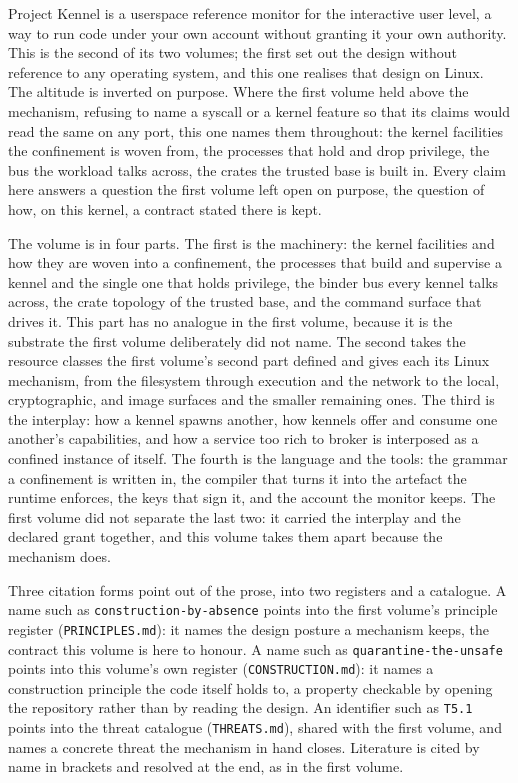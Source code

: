 Project Kennel is a userspace reference monitor for the interactive user
level, a way to run code under your own account without granting it your
own authority. This is the second of its two volumes; the first set out
the design without reference to any operating system, and this one
realises that design on Linux. The altitude is inverted on purpose.
Where the first volume held above the mechanism, refusing to name a
syscall or a kernel feature so that its claims would read the same on
any port, this one names them throughout: the kernel facilities the
confinement is woven from, the processes that hold and drop privilege,
the bus the workload talks across, the crates the trusted base is built
in. Every claim here answers a question the first volume left open on
purpose, the question of how, on this kernel, a contract stated there is
kept.

The volume is in four parts. The first is the machinery: the kernel
facilities and how they are woven into a confinement, the processes that
build and supervise a kennel and the single one that holds privilege,
the binder bus every kennel talks across, the crate topology of the
trusted base, and the command surface that drives it. This part has no
analogue in the first volume, because it is the substrate the first
volume deliberately did not name. The second takes the resource classes
the first volume's second part defined and gives each its Linux
mechanism, from the filesystem through execution and the network to the
local, cryptographic, and image surfaces and the smaller remaining ones.
The third is the interplay: how a kennel spawns another, how kennels
offer and consume one another's capabilities, and how a service too rich
to broker is interposed as a confined instance of itself. The fourth is
the language and the tools: the grammar a confinement is written in, the
compiler that turns it into the artefact the runtime enforces, the keys
that sign it, and the account the monitor keeps. The first volume did
not separate the last two: it carried the interplay and the declared
grant together, and this volume takes them apart because the mechanism
does.

Three citation forms point out of the prose, into two registers and a
catalogue. A name such as \texttt{construction-by-absence} points into
the first volume's principle register (\texttt{PRINCIPLES.md}): it names
the design posture a mechanism keeps, the contract this volume is here
to honour. A name such as \texttt{quarantine-the-unsafe} points into
this volume's own register (\texttt{CONSTRUCTION.md}): it names a
construction principle the code itself holds to, a property checkable by
opening the repository rather than by reading the design. An identifier
such as \texttt{T5.1} points into the threat catalogue
(\texttt{THREATS.md}), shared with the first volume, and names a
concrete threat the mechanism in hand closes. Literature is cited by
name in brackets and resolved at the end, as in the first volume.


